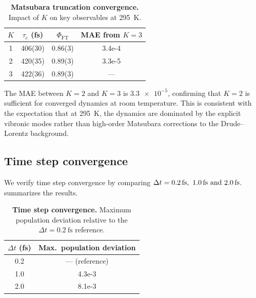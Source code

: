 \documentclass[11pt,a4paper]{article}
\begin{document}
\begin{table}[htbp]
\centering
\caption{\textbf{Matsubara truncation convergence.} Impact of $K$ on key observables at \qty{295}{\kelvin}.}
\label{tab:SI_matsubara_convergence}
\begin{tabular}{S[table-format=1.0, separate-uncertainty=false] S[table-format=3.2(2), separate-uncertainty=false] S[table-format=1.2(1), separate-uncertainty=false] S[table-format=1.1e2, separate-uncertainty=false]}
\toprule
{$K$} & {$\tau_c$ (fs)} & {$\Phi_{\mathrm{FT}}$} & {MAE from $K=3$} \\
 & 406(30) & 0.86(3) & 3.4e-4 \\
2 & 420(35) & 0.89(3) & 3.3e-5 \\
3 & 422(36) & 0.89(3) & {---} \\
\bottomrule
\end{tabular}
\end{table}

The MAE between $K=2$ and $K=3$ is $\num{3.3e-5}$, confirming that $K=2$ is sufficient for converged dynamics at room temperature.
This is consistent with the expectation that at \qty{295}{\kelvin}, the dynamics are dominated by the explicit vibronic modes rather than high-order Matsubara corrections to the Drude--Lorentz background.

\subsection{Time step convergence}

We verify time step convergence by comparing $\Delta t = \qtylist{0.2;1.0;2.0}{\fs}$.
 summarizes the results.

\begin{table}[htbp]
\centering
\caption{\textbf{Time step convergence.} Maximum population deviation relative to the $\Delta t = \qty{0.2}{\fs}$ reference.}
\label{tab:SI_timestep_convergence}
\begin{tabular}{S[table-format=1.1] S[table-format=1.1e-1]}
\toprule
{$\Delta t$ (fs)} & {Max.\ population deviation} \\
 & {--- (reference)} \\
1.0 & 4.3e-3 \\
2.0 & 8.1e-3 \\
\bottomrule
\end{tabular}
\end{table}
\end{document}
